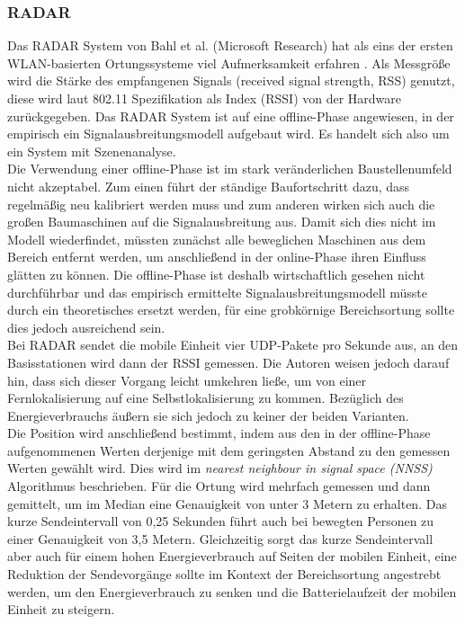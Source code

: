 \subsubsection{RADAR}
\label{ch:Vorherige:sec:RADAR}
Das RADAR System von Bahl et al. (Microsoft Research) hat als eins der ersten WLAN-basierten Ortungssysteme viel Aufmerksamkeit erfahren \cite{bahl2000radar}.
Als Messgröße wird die Stärke des empfangenen Signals (received signal strength, RSS) genutzt, diese wird laut 802.11 Spezifikation als Index (RSSI) von der Hardware zurückgegeben. 
Das RADAR System ist auf eine offline-Phase angewiesen, in der empirisch ein Signalausbreitungsmodell aufgebaut wird. 
Es handelt sich also um ein System mit Szenenanalyse.\\
Die Verwendung einer offline-Phase ist im stark veränderlichen Baustellenumfeld nicht akzeptabel. 
Zum einen führt der ständige Baufortschritt dazu, dass regelmäßig neu kalibriert werden muss und zum anderen wirken sich auch die großen Baumaschinen auf die Signalausbreitung aus. 
Damit sich dies nicht im Modell wiederfindet, müssten zunächst alle beweglichen Maschinen aus dem Bereich entfernt werden, um anschließend in der online-Phase ihren Einfluss glätten zu können.
Die offline-Phase ist deshalb wirtschaftlich gesehen nicht durchführbar und das empirisch ermittelte Signalausbreitungsmodell müsste durch ein theoretisches ersetzt werden, für eine grobkörnige Bereichsortung sollte dies jedoch ausreichend sein.\\
Bei RADAR sendet die mobile Einheit vier UDP-Pakete pro Sekunde aus, an den Basisstationen wird dann der RSSI gemessen.
Die Autoren weisen jedoch darauf hin, dass sich dieser Vorgang leicht umkehren ließe, um von einer Fernlokalisierung auf eine Selbstlokalisierung zu kommen.
Bezüglich des Energieverbrauchs äußern sie sich jedoch zu keiner der beiden Varianten.\\
Die Position wird anschließend bestimmt, indem aus den in der offline-Phase aufgenommenen Werten derjenige mit dem geringsten Abstand zu den gemessen Werten gewählt wird. 
Dies wird im \textit{nearest neighbour in signal space (NNSS)} Algorithmus beschrieben.
Für die Ortung wird mehrfach gemessen und dann gemittelt, um im Median eine Genauigkeit von unter 3 Metern zu erhalten. 
Das kurze Sendeintervall von 0,25 Sekunden führt auch bei bewegten Personen zu einer Genauigkeit von 3,5 Metern.
Gleichzeitig sorgt das kurze Sendeintervall aber auch für einem hohen Energieverbrauch auf Seiten der mobilen Einheit, eine Reduktion der Sendevorgänge sollte im Kontext der Bereichsortung angestrebt werden, um den Energieverbrauch zu senken und die Batterielaufzeit der mobilen Einheit zu steigern.

